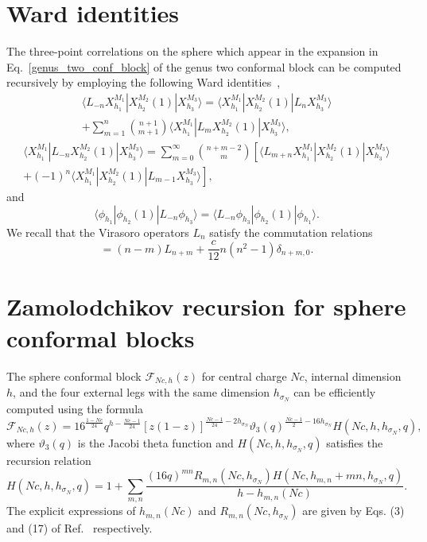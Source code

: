\documentclass[a4paper,11pt]{article}
\begin{document}
\appendix
\section{Ward identities}\label{app_ward}

The three-point correlations on the sphere which appear 
in the expansion in Eq.~\eqref{genus_two_conf_block} of the genus two conformal block can be 
computed recursively by employing the following Ward identities~\cite{Teschner},
\begin{multline}
 \langle L_{-n}X_{h_1}^{M_1}|X_{h_2}^{M_2}(1)|X_{h_3}^{M_3}\rangle=
 \langle X_{h_1}^{M_1}|X_{h_2}^{M_2}(1)|L_n X_{h_3}^{M_3}\rangle \\
 +\sum_{m= 1}^n \binom{n+1}{m+1}\langle X_{h_1}^{M_1}|L_m X_{h_2}^{M_2}(1)|X_{h_3}^{M_3}\rangle,
\end{multline}
\begin{multline}
 \langle X_{h_1}^{M_1}|L_{-n}X_{h_2}^{M_2}(1)|X_{h_3}^{M_3}\rangle=
 \sum_{m=0}^\infty\binom{n+m-2}{m}
 \left[\langle L_{m+n} X_{h_1}^{M_1}|X_{h_2}^{M_2}(1)|X_{h_3}^{M_3}\rangle \right.\\ +
 \left. (-1)^n\langle X_{h_1}^{M_1}|X_{h_2}^{M_2}(1)|L_{m-1} X_{h_3}^{M_3}\rangle\right],
\end{multline}
and
\begin{equation}
 \langle \phi_{h_1}|\phi_{h_2}(1)|L_{-n}\phi_{h_3}\rangle=
 \langle L_{-n}\phi_{h_3}|\phi_{h_2}(1)|\phi_{h_1}\rangle.
\end{equation}
We recall that the Virasoro operators $L_n$ satisfy the commutation relations
\begin{equation}
 [L_n, L_{m}]=(n-m) L_{n+m}+\frac{c}{12}n(n^2-1)\delta_{n+m, 0}.
\end{equation}




\section{Zamolodchikov recursion for sphere conformal blocks}\label{app_zamolodchikov}
The sphere conformal block $\mathcal{F}_{Nc, h}(z)$
for central charge $Nc$, internal dimension $h$, and the four
external legs with the same dimension $h_{\sigma_N}$ can be efficiently computed 
using the formula \cite{Zamolodchikov}
\begin{equation}
 \mathcal{F}_{Nc, h}(z)=
 16^{\frac{1-Nc}{24}}q^{h-\frac{Nc-1}{24}}
 [z(1-z)]^{\frac{Nc-1}{24}-2h_{\sigma_N}}
 \vartheta_3(q)^{\frac{Nc-1}{2}-16h_{\sigma_N}}H(Nc, h, h_{\sigma_N}, q),
\end{equation}
where $\vartheta_3(q)$ is the Jacobi theta function and $H(Nc, h, h_{\sigma_N}, q)$
satisfies the recursion relation 
\begin{equation}
 H(Nc, h, h_{\sigma_N}, q)=
 1+\sum_{m, n}\frac{(16q)^{mn}R_{m,n}(Nc, h_{\sigma_N})H(Nc, h_{m,n}+mn, h_{\sigma_N}, q)}
 {h-h_{m,n}(Nc)}.
\end{equation}
The explicit expressions of $h_{m,n}(Nc)$ and $R_{m, n}(Nc, h_{\sigma_N})$
are given by Eqs. (3) and (17) of Ref.~\cite{Zamolodchikov} respectively.  
\end{document}

